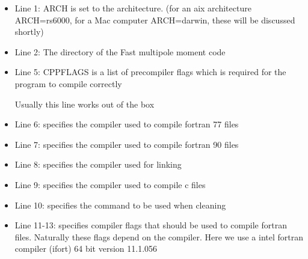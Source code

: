 \begin{itemize}
\item Line 1:  ARCH is set to the architecture. (for an aix architecture ARCH=rs6000, for a Mac computer ARCH=darwin, these will be discussed shortly)
\item Line 2:  The directory of the Fast multipole moment code
\item Line 5:  CPPFLAGS is a list of precompiler flags which is required for the program to compile correctly
  Usually this line works out of the box
\item Line 6:  specifies the compiler used to compile fortran 77 files
\item Line 7:  specifies the compiler used to compile fortran 90 files
\item Line 8:  specifies the compiler used for linking
\item Line 9:  specifies the compiler used to compile c files
\item Line 10:  specifies the command to be used when cleaning
\item Line 11-13:  specifies compiler flags that should be used to compile fortran files. Naturally these flags depend on the compiler. Here we use a intel fortran compiler (ifort) 64 bit version 11.1.056
\end{itemize}
